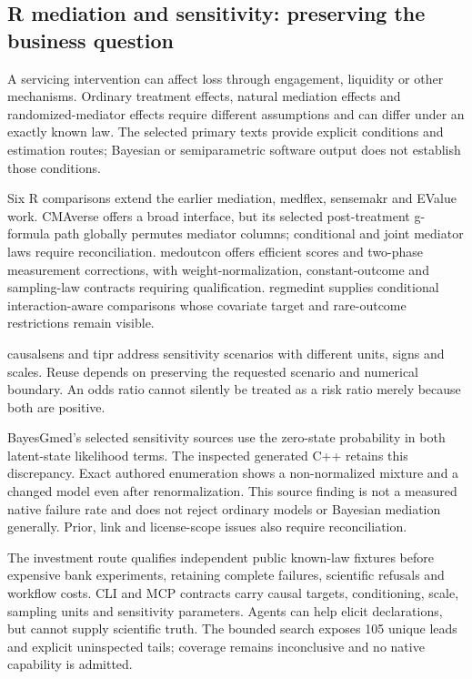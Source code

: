 \hypertarget{r-mediation-and-sensitivity-preserving-the-business-question}{%
\subsection{R mediation and sensitivity: preserving the business
question}\label{r-mediation-and-sensitivity-preserving-the-business-question}}

A servicing intervention can affect loss through engagement, liquidity
or other mechanisms. Ordinary treatment effects, natural mediation
effects and randomized-mediator effects require different assumptions
and can differ under an exactly known law. The selected primary texts
provide explicit conditions and estimation routes; Bayesian or
semiparametric software output does not establish those conditions.
\citep{exec25_rmed_diaz_paper,exec25_rmed_yimer_paper}

Six R comparisons extend the earlier mediation, medflex, sensemakr and
EValue work. CMAverse offers a broad interface, but its selected
post-treatment g-formula path globally permutes mediator columns;
conditional and joint mediator laws require reconciliation. medoutcon
offers efficient scores and two-phase measurement corrections, with
weight-normalization, constant-outcome and sampling-law contracts
requiring qualification. regmedint supplies conditional
interaction-aware comparisons whose covariate target and rare-outcome
restrictions remain visible.
\citep{exec25_rmed_cmaverse,exec25_rmed_medoutcon,exec25_rmed_regmedint}

causalsens and tipr address sensitivity scenarios with different units,
signs and scales. Reuse depends on preserving the requested scenario and
numerical boundary. An odds ratio cannot silently be treated as a risk
ratio merely because both are positive.
\citep{exec25_rmed_causalsens,exec25_rmed_tipr}

BayesGmed's selected sensitivity sources use the zero-state probability
in both latent-state likelihood terms. The inspected generated C++
retains this discrepancy. Exact authored enumeration shows a
non-normalized mixture and a changed model even after renormalization.
This source finding is not a measured native failure rate and does not
reject ordinary models or Bayesian mediation generally. Prior, link and
license-scope issues also require reconciliation.
\citep{exec25_rmed_bayesgmed,exec25_rmed_choice}

The investment route qualifies independent public known-law fixtures
before expensive bank experiments, retaining complete failures,
scientific refusals and workflow costs. CLI and MCP contracts carry
causal targets, conditioning, scale, sampling units and sensitivity
parameters. Agents can help elicit declarations, but cannot supply
scientific truth. The bounded search exposes 105 unique leads and
explicit uninspected tails; coverage remains inconclusive and no native
capability is admitted. \citep{exec25_rmed_choice}

